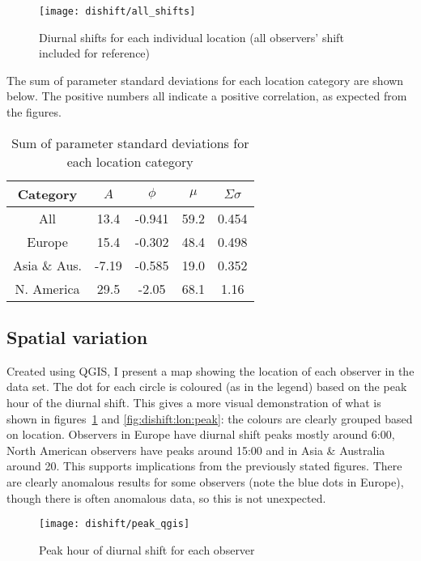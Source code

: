 \begin{figure}[h!]
	\centering
	\texttt{[image: dishift/all\_shifts]}
	\caption{Diurnal shifts for each individual location (all observers' shift included for reference)
		\label{fig:dishift:all}}
\end{figure}

The sum of parameter standard deviations for each location category are shown below. The positive numbers all indicate a positive correlation, as expected from the figures. 
\begin{table}[h!]
	\begin{tabular}{ccccc}
		\hline
		Category & $A$ & $\phi$ & $\mu$ & $\Sigma \sigma$ \\ \hline
		All & 13.4 & -0.941 & 59.2 & 0.454 \\
		Europe & 15.4 & -0.302 & 48.4 & 0.498 \\
		Asia \& Aus. & -7.19 & -0.585 & 19.0 & 0.352 \\
		N. America & 29.5 & -2.05 & 68.1 & 1.16 \\
		\hline
	\end{tabular}
	\caption{Sum of parameter standard deviations for each location category}
\end{table}

\subsection{Spatial variation}
Created using QGIS, I present a map showing the location of each observer in the data set. The dot for each circle is coloured (as in the legend) based on the peak hour of the diurnal shift. This gives a more visual demonstration of what is shown in figures~\ref{fig:dishift:all} and \ref{fig:dishift:lon:peak}: the colours are clearly grouped based on location. Observers in Europe have diurnal shift peaks mostly around 6:00, North American observers have peaks around 15:00 and in Asia \& Australia around 20. This supports implications from the previously stated figures. There are clearly anomalous results for some observers (note the blue dots in Europe), though there is often anomalous data, so this is not unexpected.
\begin{figure}[h!]
	\centering
	\texttt{[image: dishift/peak\_qgis]}
	\caption{Peak hour of diurnal shift for each observer
		\label{fig:dishift:qgis}}
\end{figure}
